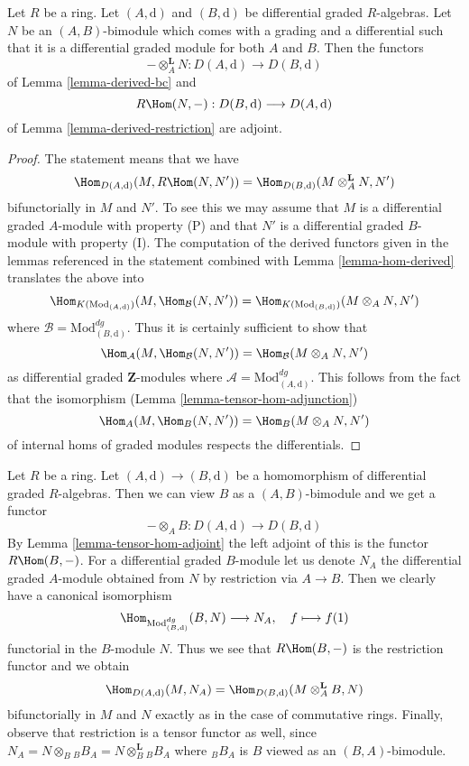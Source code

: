 \begin{lemma}
\label{lemma-tensor-hom-adjoint}
Let $R$ be a ring.
Let $(A, \text{d})$ and $(B, \text{d})$ be differential graded $R$-algebras.
Let $N$ be an $(A, B)$-bimodule which comes with a grading and a differential
such that it is a differential graded module for both $A$ and $B$.
Then the functors
$$
- \otimes_A^\mathbf{L} N : D(A, \text{d}) \longrightarrow D(B, \text{d})
$$
of Lemma \ref{lemma-derived-bc} and
$$
R\Hom(N, -) : D(B, \text{d}) \longrightarrow D(A, \text{d})
$$
of Lemma \ref{lemma-derived-restriction} are adjoint.
\end{lemma}

\begin{proof}
The statement means that we have
$$
\Hom_{D(A, \text{d})}(M, R\Hom(N, N')) =
\Hom_{D(B, \text{d})}(M \otimes^\mathbf{L}_A N, N')
$$
bifunctorially in $M$ and $N'$. To see this we may assume that $M$
is a differential graded $A$-module with property (P) and that $N'$
is a differential graded $B$-module with property (I). The computation
of the derived functors given in the lemmas referenced in the statement
combined with Lemma \ref{lemma-hom-derived} translates the above into
$$
\Hom_{K(\text{Mod}_{(A, \text{d})})}(M, \Hom_\mathcal{B}(N, N')) =
\Hom_{K(\text{Mod}_{(B, \text{d})})}(M \otimes_A N, N')
$$
where $\mathcal{B} = \text{Mod}^{dg}_{(B, \text{d})}$. Thus it is certainly
sufficient to show that
$$
\Hom_\mathcal{A}(M, \Hom_\mathcal{B}(N, N')) =
\Hom_\mathcal{B}(M \otimes_A N, N')
$$
as differential graded $\mathbf{Z}$-modules where
$\mathcal{A} = \text{Mod}^{dg}_{(A, \text{d})}$.
This follows from the fact that the isomorphism
(Lemma \ref{lemma-tensor-hom-adjunction})
$$
\Hom_A(M, \Hom_B(N, N')) = \Hom_B(M \otimes_A N, N')
$$
of internal homs of graded modules respects the differentials.
\end{proof}

\begin{example}
\label{example-map-hom-tensor}
Let $R$ be a ring. Let $(A, \text{d}) \to (B, \text{d})$ be a
homomorphism of differential graded $R$-algebras. Then we can
view $B$ as a $(A, B)$-bimodule and we get a functor
$$
- \otimes_A B : D(A, \text{d}) \longrightarrow D(B, \text{d})
$$
By Lemma \ref{lemma-tensor-hom-adjoint} the left adjoint of this
is the functor $R\Hom(B, -)$. For a differential graded $B$-module
let us denote $N_A$ the differential graded $A$-module obtained
from $N$ by restriction via $A \to B$. Then we clearly have
a canonical isomorphism
$$
\Hom_{\text{Mod}^{dg}_{(B, \text{d})}}(B, N) \longrightarrow N_A,\quad
f \longmapsto f(1)
$$
functorial in the $B$-module $N$. Thus we see that
$R\Hom(B, -)$ is the restriction functor and we obtain
$$
\Hom_{D(A, \text{d})}(M, N_A) =
\Hom_{D(B, \text{d})}(M \otimes^\mathbf{L}_A B, N)
$$
bifunctorially in $M$ and $N$ exactly as in the case of commutative rings.
Finally, observe that restriction is a tensor functor as well,
since $N_A = N \otimes_B {}_BB_A = N \otimes_B^\mathbf{L} {}_BB_A$
where ${}_BB_A$ is $B$ viewed as an $(B, A)$-bimodule.
\end{example}

